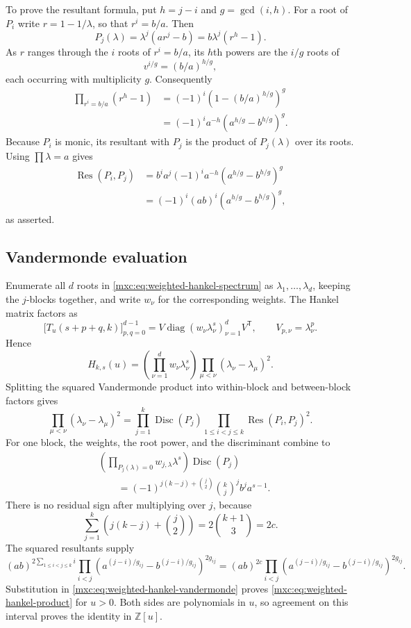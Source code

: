 \documentclass[11pt]{article}
\numberwithin{equation}{section}
\theoremstyle{definition}
\theoremstyle{remark}
\begin{document}
To prove the resultant formula, put $h=j-i$ and $g=\gcd(i,h)$.
For a root of $P_i$ write $r=1-1/\lambda$, so that $r^i=b/a$.
Then
\[
 P_j(\lambda)
 =\lambda^j(ar^j-b)
 =b\lambda^j(r^h-1).
\]
As $r$ ranges through the $i$ roots of $r^i=b/a$, its $h$th powers
are the $i/g$ roots of
\[
 v^{i/g}=(b/a)^{h/g},
\]
each occurring with multiplicity $g$.  Consequently
\begin{align*}
 \prod_{r^i=b/a}(r^h-1)
 &=(-1)^i\left(1-(b/a)^{h/g}\right)^g\\
 &=(-1)^ia^{-h}\left(a^{h/g}-b^{h/g}\right)^g.
\end{align*}
Because $P_i$ is monic, its resultant with $P_j$ is the product of
$P_j(\lambda)$ over its roots.  Using $\prod\lambda=a$ gives
\begin{align*}
 \operatorname{Res}(P_i,P_j)
 &=b^ia^j(-1)^ia^{-h}
   \left(a^{h/g}-b^{h/g}\right)^g\\
 &=(-1)^i(ab)^i
   \left(a^{h/g}-b^{h/g}\right)^g,
\end{align*}
as asserted.

\subsection{Vandermonde evaluation}

Enumerate all $d$ roots in \eqref{mxc:eq:weighted-hankel-spectrum} as
$\lambda_1,\ldots,\lambda_d$, keeping the $j$-blocks together, and
write $w_\nu$ for the corresponding weights.  The Hankel matrix
factors as
\[
 \bigl[T_u(s+p+q,k)\bigr]_{p,q=0}^{d-1}
 =V\operatorname{diag}(w_\nu\lambda_\nu^s)_{\nu=1}^{d}V^{\mathsf T},
 \qquad V_{p,\nu}=\lambda_\nu^p.
\]
Hence
\begin{equation}
 H_{k,s}(u)
 =\left(\prod_{\nu=1}^{d}w_\nu\lambda_\nu^s\right)
  \prod_{\mu<\nu}(\lambda_\nu-\lambda_\mu)^2.
 \label{mxc:eq:weighted-hankel-vandermonde}
\end{equation}
Splitting the squared Vandermonde product into within-block and
between-block factors gives
\[
 \prod_{\mu<\nu}(\lambda_\nu-\lambda_\mu)^2
 =\prod_{j=1}^{k}\operatorname{Disc}(P_j)
  \prod_{1\leq i<j\leq k}\operatorname{Res}(P_i,P_j)^2.
\]
For one block, the weights, the root power, and the discriminant
combine to
\begin{align*}
 &\left(\prod_{P_j(\lambda)=0}w_{j,\lambda}\lambda^s\right)
  \operatorname{Disc}(P_j)\\
 &\qquad=
 (-1)^{j(k-j)+\binom j2}\binom{k}{j}^{j}
 b^j a^{s-1}.
\end{align*}
There is no residual sign after multiplying over $j$, because
\[
 \sum_{j=1}^{k}\left(j(k-j)+\binom j2\right)
 =2\binom{k+1}{3}=2c.
\]
The squared resultants supply
\[
 (ab)^{2\sum_{1\leq i<j\leq k}i}
 \prod_{i<j}\left(a^{(j-i)/g_{ij}}-b^{(j-i)/g_{ij}}\right)^{2g_{ij}}
 =(ab)^{2c}
 \prod_{i<j}\left(a^{(j-i)/g_{ij}}-b^{(j-i)/g_{ij}}\right)^{2g_{ij}}.
\]
Substitution in \eqref{mxc:eq:weighted-hankel-vandermonde} proves
\eqref{mxc:eq:weighted-hankel-product} for $u>0$.  Both sides are
polynomials in $u$, so agreement on this interval proves the
identity in $\mathbb Z[u]$.
\end{document}
